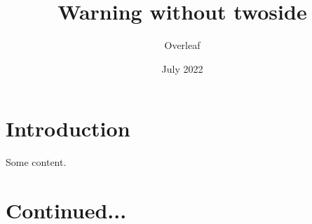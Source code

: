 \documentclass{article}
\begin{document}
	\pagestyle{fancy}
	\title{Warning without twoside}
	\author{Overleaf}
	\date{July 2022}
	\fancyfoot[E]{\thepage}%
	\maketitle
	\section{Introduction}
	Some content.
	\newpage
	\section{Continued...}
\end{document}
